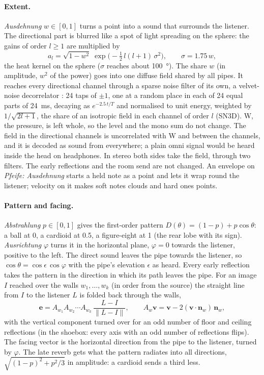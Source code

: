 \documentclass[11pt,a4paper,parskip=half,DIV=11,toc=bibliography]{scrartcl}
\newcommand{\ui}[1]{\emph{#1}}                 %
\begin{document}
\paragraph{Extent.} \ui{Ausdehnung} $w\in[0,1]$ turns a point into a sound that surrounds the listener. The directional part is
blurred like a spot of light spreading on the sphere: the gains of order $l\ge1$ are multiplied by
\[ a_l = \sqrt{1-w^2}\;\exp\bigl(-\tfrac12\,l(l+1)\,\sigma^2\bigr),\qquad \sigma = 1.75\,w, \]
the heat kernel on the sphere ($\sigma$ reaches about \SI{100}{\degree}). The share $w$ (in amplitude, $w^2$ of the power) goes into one
diffuse field shared by all pipes. It reaches every directional channel through a sparse noise filter of its own, a velvet-noise
decorrelator \citep{alary2017velvet}: 24 taps of $\pm1$, one at a random place in each of 24 equal parts of \SI{24}{ms}, decaying as
$e^{-2.5\,t/T}$ and normalised to unit energy, weighted by $1/\sqrt{2l+1}$, the share of an isotropic field in each channel of order $l$
(SN3D). W, the pressure, is left whole, so the level and the mono sum do not change. The field in the directional channels is
uncorrelated with W and between the channels, and it is decoded as sound from everywhere; a plain omni signal would be heard inside
the head on headphones. In stereo both sides take the field, through two filters. The early reflections and the room send are not
changed. An envelope on \ui{Pfeife: Ausdehnung} starts a held note as a point and lets it wrap round the listener; velocity on it makes
soft notes clouds and hard ones points.

\paragraph{Pattern and facing.} \ui{Abstrahlung} $p\in[0,1]$ gives the first-order pattern $D(\theta) = (1-p) + p\cos\theta$: a ball at 0,
a cardioid at 0.5, a figure-eight at 1 (the rear lobe with its sign). \ui{Ausrichtung} $\varphi$ turns it in the horizontal plane,
$\varphi = 0$ towards the listener, positive to the left. The direct sound leaves the pipe towards the listener, so
$\cos\theta = \cos\epsilon\,\cos\varphi$ with the pipe's elevation $\epsilon$ as heard. Every early reflection takes the pattern in the
direction in which its path leaves the pipe. For an image $I$ reached over the walls $w_1,\dots,w_k$ (in order from the source) the
straight line from $I$ to the listener $L$ is folded back through the walls,
\[ \mathbf e = A_{w_1}A_{w_2}\cdots A_{w_k}\,\frac{L-I}{\lVert L-I\rVert},\qquad A_w\mathbf v = \mathbf v - 2(\mathbf v\cdot\mathbf n_w)\,\mathbf n_w, \]
with the vertical component turned over for an odd number of floor and ceiling reflections (in the shoebox: every axis with an odd
number of reflections flips). The facing vector is the horizontal direction from the pipe to the listener, turned by $\varphi$. The late
reverb gets what the pattern radiates into all directions, $\sqrt{(1-p)^2 + p^2/3}$ in amplitude: a cardioid sends a third less.
\end{document}
